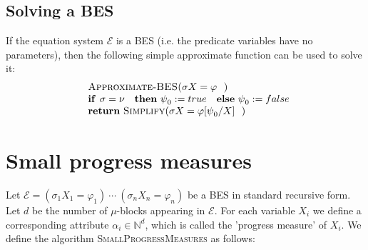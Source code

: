\documentclass{article}
\begin{document}
\subsection{Solving a BES}

If the equation system $\mathcal{E}$ is a BES (i.e. the predicate variables
have no parameters), then the following simple approximate function can be
used to solve it:%
\begin{equation*}
\begin{array}{l}
\text{\textsc{Approximate-BES(}}\sigma X=\varphi \text{\textsc{)}} \\ 
\text{\textbf{if }}\sigma =\nu \text{ \textbf{then} }\psi _{0}:=true \text{ 
\textbf{else} }\psi _{0}:=false \\ 
\text{\textbf{return} \textsc{Simplify}(}\sigma X=\varphi \lbrack \psi
_{0}/X]\text{)}%
\end{array}%
\end{equation*}

\newpage

\section{Small progress measures}

Let $\mathcal{E}=(\sigma _{1}X_{1}=\varphi _{1})\ \cdots \ (\sigma
_{n}X_{n}=\varphi _{n})$ be a BES in standard recursive form. Let $d$ be the
number of $\mu $-blocks appearing in $\mathcal{E}$. For each variable $X_{i}$
we define a corresponding attribute $\alpha _{i}\in \mathbb{N}^{d}$, which
is called the 'progress measure' of $X_{i}$. We define the algorithm \textsc{%
SmallProgressMeasures} as follows:
\end{document}
